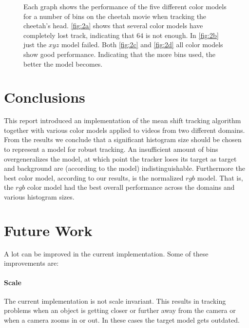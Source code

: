 \documentclass[11pt]{article}
\begin{document}
\begin{figure}
{\label{fig:2c}
}
\caption{Each graph shows the performance of the five different color models for
a number of bins on the cheetah movie when tracking the cheetah's head.
\ref{fig:2a} shows that several color models have completely lost track,
indicating that $64$ is not enough. In \ref{fig:2b} just the $xyz$ model failed.
Both \ref{fig:2c} and \ref{fig:2d} all color models show good performance.
Indicating that the more bins used, the better the model becomes.}
\label{fig:cheetah}
\end{figure}

\section{Conclusions} \label{sec:conclusion}
This report introduced an implementation of the mean shift tracking algorithm
together with various color models applied to videos from two different domains.
From the results we conclude that a significant histogram size should be chosen
to represent a model for robust tracking. An insufficient amount of bins
overgeneralizes the model, at which point the tracker loses its target as
target and background are (according to the model) indistinguishable.
Furthermore the best color model, according to our results, is the normalized
$rgb$ model. That is, the $rgb$ color model had the best overall performance
across the domains and various histogram sizes.

\section{Future Work} \label{sec:future}
A lot can be improved in the current implementation. Some of these improvements
are:
\paragraph{Scale} The current implementation is not scale invariant. This
results in tracking problems when an object is getting closer or further away
from the camera or when a camera zooms in or out. In these cases the target
model gets outdated. 
\end{document}
